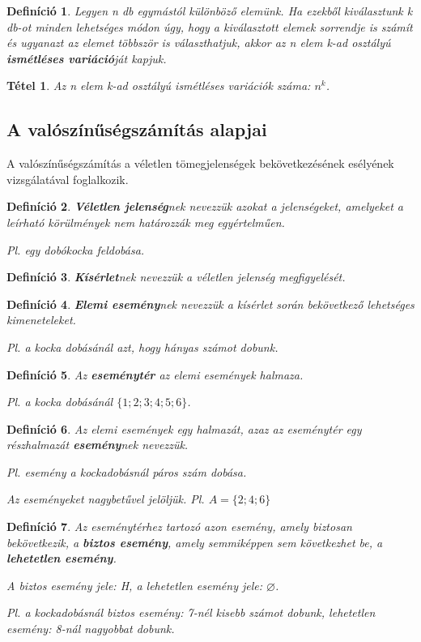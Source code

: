 \documentclass[12pt,a4paper]{article}
\newtheorem{theorem}{Tétel} [section]
\newtheorem{definition}{Definíció} [section]
\begin{document}
\begin{definition}
Legyen n db egymástól különböző elemünk. Ha ezekből kiválasztunk k db-ot minden lehetséges módon úgy, hogy a kiválasztott elemek sorrendje is számít és ugyanazt az elemet többször is választhatjuk, akkor az n elem k-ad osztályú \textbf{ismétléses variáció}ját kapjuk.
\end{definition}
\begin{theorem}
Az n elem k-ad osztályú ismétléses variációk száma: $n^k$.
\end{theorem}

\subsection{A valószínűségszámítás alapjai}
A valószínűségszámítás a véletlen tömegjelenségek bekövetkezésének esélyének vizsgálatával foglalkozik.
\begin{definition}
\textbf{Véletlen jelenség}nek nevezzük azokat a jelenségeket, amelyeket a leírható körülmények nem határozzák meg egyértelműen.

Pl. egy dobókocka feldobása.
\end{definition}

\begin{definition}
\textbf{Kísérlet}nek nevezzük a véletlen jelenség megfigyelését.
\end{definition}

\begin{definition}
\textbf{Elemi esemény}nek nevezzük a kísérlet során bekövetkező lehetséges kimeneteleket.

Pl. a kocka dobásánál azt, hogy hányas számot dobunk.
\end{definition}

\begin{definition}
Az \textbf{eseménytér} az elemi események halmaza.

Pl. a kocka dobásánál $\{1; 2; 3; 4; 5; 6\}$.
\end{definition}

\begin{definition}
Az elemi események egy halmazát, azaz az eseménytér egy részhalmazát \textbf{esemény}nek nevezzük.

Pl. esemény a kockadobásnál páros szám dobása.

Az eseményeket nagybetűvel jelöljük. Pl. $A = \{2; 4; 6\}$
\end{definition}

\begin{definition}
Az eseménytérhez tartozó azon esemény, amely biztosan bekövetkezik, a \textbf{biztos esemény}, amely semmiképpen sem következhet be, a \textbf{lehetetlen esemény}.

A biztos esemény jele: H, a lehetetlen esemény jele: $\varnothing$.

Pl. a kockadobásnál biztos esemény: 7-nél kisebb számot dobunk, lehetetlen esemény: 8-nál nagyobbat dobunk.
\end{definition}
\end{document}
